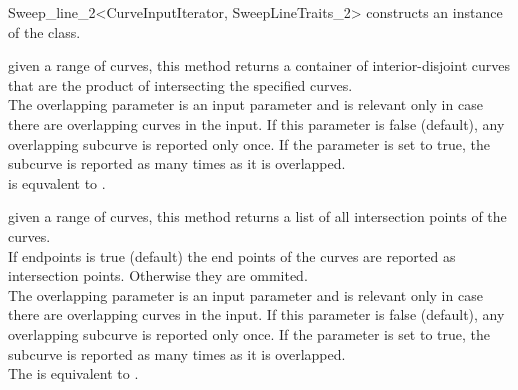 \begin{ccRefClass}{Sweep_line_2<CurveInputIterator, SweepLineTraits_2>}
   {constructs an instance of the  class.}
    

\ccTypes
{}

\ccQueryFunctions

{given a range of curves, this method returns a container of 
interior-disjoint curves that are the product of intersecting 
the specified curves. 
\\The overlapping parameter is an input parameter and is relevant 
only in case there are overlapping curves in the input. If this parameter 
is false (default), any overlapping subcurve is reported only once. If the 
parameter is set to true, the subcurve is reported as many times as it 
is overlapped.
\\ is equvalent to 
.}

{given a range of curves, this method returns a list of all intersection
points of the curves. 
\\If endpoints is true (default) the end points
of the curves are reported as intersection points. Otherwise they are 
ommited. 
\\The overlapping parameter is an input parameter and is relevant 
only in case there are overlapping curves in the input. If this parameter 
is false (default), any overlapping subcurve is reported only once. If the 
parameter is set to true, the subcurve is reported as many times as it 
is overlapped.
\\The {} is equivalent to
.}



\end{ccRefClass}
